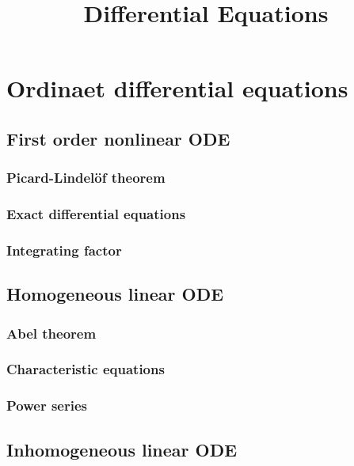 \documentclass{../prb}
\title{Differential Equations}
\begin{document}
\maketitle
\tableofcontents


\chapter{Ordinaet differential equations}
\section{First order nonlinear ODE}

\subsection{Picard-Lindel\"of theorem}

\subsection{Exact differential equations}

\subsection{Integrating factor}



\section{Homogeneous linear ODE}

\subsection{Abel theorem}

\subsection{Characteristic equations}

\subsection{Power series}



\section{Inhomogeneous linear ODE}
\end{document}
